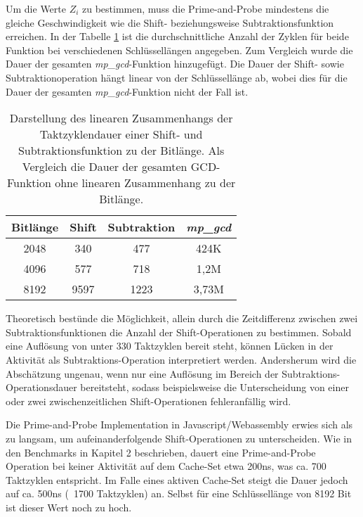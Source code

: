 Um die Werte $Z_i$ zu bestimmen, muss die Prime-and-Probe mindestens die gleiche Geschwindigkeit wie die Shift- beziehungsweise Subtraktionsfunktion erreichen.
In der Tabelle \ref{tbl:ShiftSubCycles} ist die durchschnittliche Anzahl der Zyklen für beide Funktion bei verschiedenen Schlüssellängen angegeben. Zum Vergleich wurde die Dauer der gesamten \textit{mp_gcd}-Funktion hinzugefügt.
Die Dauer der Shift- sowie Subtraktionoperation hängt linear von der Schlüssellänge ab, wobei dies für die Dauer der gesamten \textit{mp_gcd}-Funktion nicht der Fall ist.

\begin{table}[h]
\caption{Darstellung des linearen Zusammenhangs der Taktzyklendauer einer Shift- und Subtraktionsfunktion zu der Bitlänge. Als Vergleich die Dauer der gesamten GCD-Funktion ohne linearen Zusammenhang zu der Bitlänge.}
\label{tbl:ShiftSubCycles}
\begin{tabular}{cccc}
\toprule
Bitlänge & Shift & Subtraktion & \textit{mp_gcd} \\
\midrule
2048     & 340   & 477         & 424K                              \\
4096     & 577   & 718         & 1,2M                              \\
8192     & 9597  & 1223        & 3,73M                             \\
\bottomrule
\end{tabular}
\end{table}

Theoretisch bestünde die Möglichkeit, allein durch die Zeitdifferenz zwischen zwei Subtraktionsfunktionen die Anzahl der Shift-Operationen zu bestimmen.
Sobald eine Auflösung von unter 330 Taktzyklen bereit steht, können Lücken in der Aktivität als Subtraktions-Operation interpretiert werden.
Andersherum wird die Abschätzung ungenau, wenn nur eine Auflösung im Bereich der Subtraktions-Operationsdauer bereitsteht, sodass beispielsweise die Unterscheidung von einer oder zwei zwischenzeitlichen Shift-Operationen fehleranfällig wird.

Die Prime-and-Probe Implementation in Javascript/Webassembly erwies sich als zu langsam, um aufeinanderfolgende Shift-Operationen zu unterscheiden.
Wie in den Benchmarks in Kapitel 2 beschrieben, dauert eine Prime-and-Probe Operation bei keiner Aktivität auf dem Cache-Set etwa 200ns, was ca. 700 Taktzyklen entspricht.
Im Falle eines aktiven Cache-Set steigt die Dauer jedoch auf ca. 500ns (~1700 Taktzyklen) an.
Selbst für eine Schlüssellänge von 8192 Bit ist dieser Wert noch zu hoch.

